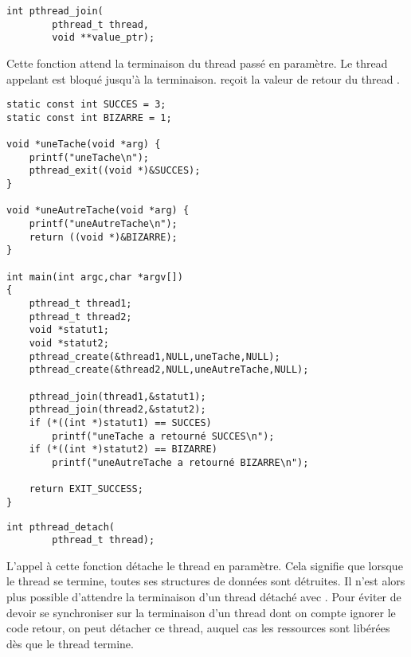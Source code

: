 \label{func:pthread_join}

\begin{lstlisting}
int pthread_join(
		pthread_t thread,
		void **value_ptr);
\end{lstlisting}

Cette fonction attend la terminaison du thread passé en paramètre. Le thread appelant est bloqué jusqu'à la terminaison.  reçoit la valeur de retour du thread .

\begin{lstlisting}
static const int SUCCES = 3;
static const int BIZARRE = 1;

void *uneTache(void *arg) {
	printf("uneTache\n");
	pthread_exit((void *)&SUCCES);
}

void *uneAutreTache(void *arg) {
	printf("uneAutreTache\n");
	return ((void *)&BIZARRE);
}

int main(int argc,char *argv[])
{
	pthread_t thread1;
	pthread_t thread2;
	void *statut1;
	void *statut2;
	pthread_create(&thread1,NULL,uneTache,NULL);
	pthread_create(&thread2,NULL,uneAutreTache,NULL);

	pthread_join(thread1,&statut1);
	pthread_join(thread2,&statut2);
	if (*((int *)statut1) == SUCCES)
		printf("uneTache a retourné SUCCES\n");
	if (*((int *)statut2) == BIZARRE)
		printf("uneAutreTache a retourné BIZARRE\n");

	return EXIT_SUCCESS;
}
\end{lstlisting}

\label{func:pthread_detach}

\begin{lstlisting}
int pthread_detach(
		pthread_t thread);
\end{lstlisting}

L'appel à cette fonction détache le thread en paramètre. Cela signifie que lorsque le thread se termine, toutes ses structures de données sont détruites. Il n'est alors plus possible d'attendre la terminaison d'un thread détaché avec . Pour éviter de devoir se synchroniser sur la terminaison d'un thread dont on compte ignorer le code retour, on peut détacher ce thread, auquel cas les ressources sont libérées dès que le thread termine.

